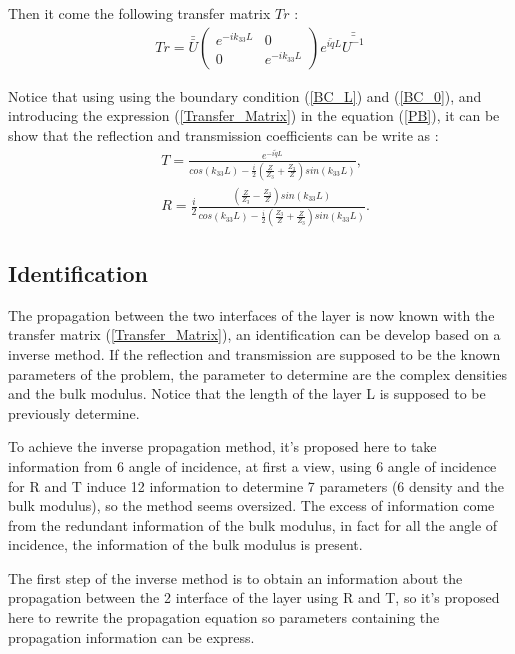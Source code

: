 \documentclass{article}
\begin{document}
    Then it come the following transfer matrix $Tr$ :
        \begin{align}
    Tr=\bar{\bar{U}}\begin{pmatrix}
    e^{-ik_{33}L} & 0 \\ 0 & e^{-ik_{33}L} 
    \end{pmatrix} e^{i\tilde{q}L}\bar{\bar{U^{-1}}}\label{Transfer_Matrix}
    \end{align}
    
    Notice that using using the boundary condition (\ref{BC_L}) and (\ref{BC_0}), and introducing the expression (\ref{Transfer_Matrix}) in the equation  (\ref{PB}), it can be show that the reflection and transmission coefficients can be write as :
        \begin{align}
    &T=\frac{e^{-i\tilde{q}L}}{cos(k_{33}L)-\frac{i}{2}(\frac{Z}{Z_3}+\frac{Z_3}{Z})sin(k_{33}L)}\label{Transmission},\\ 
    &R=\frac{i}{2} \frac{(\frac{Z}{Z_3}-\frac{Z_3}{Z})sin(k_{33}L)}{cos(k_{33}L)-\frac{i}{2}(\frac{Z_3}{Z}+\frac{Z}{Z_3})sin(k_{33}L)}\label{Reflexion}. 
      \end{align}

\subsection{Identification}
    The propagation between the two interfaces of the layer is now known with the transfer matrix (\ref{Transfer_Matrix}), an identification can be develop based on a inverse method. If the reflection and transmission are supposed to be the known parameters of the problem, the parameter to determine are the complex densities and the bulk modulus. Notice that the length of the layer L is supposed to be previously determine.
    
    To achieve the inverse propagation method, it's proposed here to take information from 6 angle of incidence, at first a view, using 6 angle of incidence for R and T induce 12 information to determine 7 parameters (6 density and the bulk modulus), so the method seems oversized. The excess of information come from the redundant information of the bulk modulus, in fact for all the angle of incidence, the information of the bulk modulus is present. 
    
    The first step of the inverse method is to obtain an information about the propagation between the 2 interface of the layer using R and T, so it's proposed here to rewrite the propagation equation so parameters containing the propagation information can be express. 
    
\end{document}
